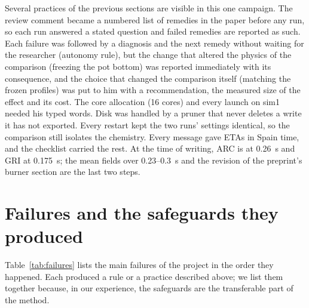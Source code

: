 \documentclass[preprint,review,12pt]{elsarticle}
\begin{document}
Several practices of the previous sections are visible in this one campaign. The review comment became a numbered list
of remedies in the paper before any run, so each run answered a stated question and failed remedies are reported as
such. Each failure was followed by a diagnosis and the next remedy without waiting for the researcher (autonomy rule),
but the change that altered the physics of the comparison (freezing the pot bottom) was reported immediately with its
consequence, and the choice that changed the comparison itself (matching the frozen profiles) was put to him with a
recommendation, the measured size of the effect and its cost. The core allocation (16 cores) and every launch on sim1
needed his typed words. Disk was handled by a pruner that never deletes a write it has not exported. Every restart
kept the two runs' settings identical, so the comparison still isolates the chemistry. Every message gave ETAs in Spain
time, and the checklist carried the rest. At the time of writing, ARC is at 0.26~s and GRI at 0.175~s; the mean fields
over 0.23--0.3~s and the revision of the preprint's burner section are the last two steps.

\section{Failures and the safeguards they produced}\label{sec:failures}

Table~\ref{tab:failures} lists the main failures of the project in the order they happened. Each produced a rule or a
practice described above; we list them together because, in our experience, the safeguards are the transferable part
of the method.
\end{document}
